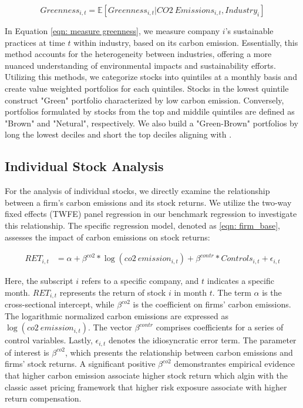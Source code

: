 \documentclass[12pt]{article}
\begin{document}
\begin{equation}
\label{eqn: measure greenness}
Greenness_{i, t} = \mathbb{E}[Greenness_{i,t} | CO2 \: Emissions_{i, t}, Industry_i]
\end{equation}

In Equation \ref{eqn: measure greenness}, we measure company $i$'s sustainable practices at time $t$ within industry, based on its carbon emission. Essentially, this method accounts for the heterogeneity between industries, offering a more nuanced understanding of environmental impacts and sustainability efforts. Utilizing this methods, we categorize stocks into quintiles at a monthly basis and create value weighted portfolios for each quintiles. Stocks in the lowest quintile construct "Green" portfolio characterized by low carbon emission. Conversely, portfolios formulated by stocks from the top and middile quintiles are defined as "Brown" and "Netural", respectively. We also build a "Green-Brown" portfolios by long the lowest deciles and short the top deciles aligning with \citet{pastor2022dissecting}.

\subsection{Individual Stock Analysis}
For the analysis of individual stocks, we directly examine the relationship between a firm's carbon emissions and its stock returns. We utilize the two-way fixed effects (TWFE) panel regression in our benchmark regression to investigate this relationship. The specific regression model, denoted as \ref{eqn: firm_base}, assesses the impact of carbon emissions on stock returns:

\begin{align}
    \label{eqn: firm_base}
    RET_{i, t} &= \alpha + \beta^{co2}*\log(co2 \: emission_{i, t}) + \beta^{contr}*Controls_{i, t} + \epsilon_{i, t}
\end{align}
    
Here, the subscript $i$ refers to a specific company, and $t$ indicates a specific month. $RET_{i, t}$ represents the return of stock $i$ in month $t$. The term $\alpha$ is the cross-sectional intercept, while $\beta^{co2}$ is the coefficient on firms' carbon emissions. The logarithmic normalized carbon emissions are expressed as $\log(co2 \: emission_{i, t})$. The vector $\beta^{contr}$ comprises coefficients for a series of control variables. Lastly, $\epsilon_{i, t}$ denotes the idiosyncratic error term. The parameter of interest is $\beta^{co2}$, which presents the relationship between carbon emissions and firms' stock returns. A significant positive $\beta^{co2}$ demonstrantes empirical evidence that higher carbon emission associate higher stock return which algin with the classic asset pricing framework that higher risk exposure associate with higher return compensation.
\end{document}

